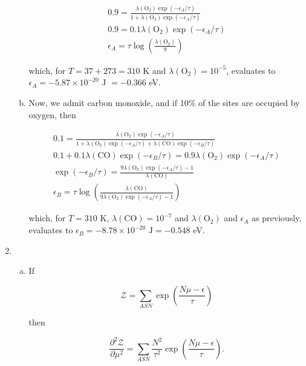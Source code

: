 \documentclass{article}
\begin{document}
\begin{enumerate}
\begin{enumerate}[(a)]
		\begin{gather*}
		0.9 = \frac{\lambda(\text{O}_2)\exp(-\epsilon_A / \tau)}{1 + \lambda(\text{O}_2)\exp(-\epsilon_A / \tau)} \\
		0.9 = 0.1 \lambda(\text{O}_2)\exp(-\epsilon_A / \tau) \\
		\epsilon_A = \tau \log \left( \frac{\lambda(\text{O}_2)}{9} \right)
		\end{gather*}

		which, for $T = 37 + 273 = 310$ K and $\lambda(\text{O}_2) = 10^{-5}$, evaluates to $\epsilon_A = -5.87 \times 10^{-20}$ J $= -0.366$ eV.

		\item

		Now, we admit carbon monoxide, and if 10\% of the sites are occupied by oxygen, then

		\begin{gather*}
		0.1 = \frac{\lambda(\text{O}_2)\exp(-\epsilon_A / \tau)}{1 + \lambda(\text{O}_2)\exp(-\epsilon_A / \tau) + \lambda(\text{CO})\exp(-\epsilon_B / \tau)} \\
		0.1 + 0.1\lambda(\text{CO})\exp(-\epsilon_B / \tau) = 0.9\lambda(\text{O}_2)\exp(-\epsilon_A / \tau) \\
		\exp(-\epsilon_B / \tau) = \frac{9\lambda(\text{O}_2)\exp(-\epsilon_A / \tau) - 1}{\lambda(\text{CO})} \\
		\epsilon_B = \tau \log \left(\frac{\lambda(\text{CO})}{9\lambda(\text{O}_2)\exp(-\epsilon_A / \tau) - 1} \right) 
		\end{gather*}

		which, for $T = 310$ K, $\lambda(\text{CO}) = 10^{-7}$ and $\lambda(\text{O}_2)$ and $\epsilon_A$ as previously, evaluates to $\epsilon_B = -8.78 \times 10^{-20} \text{ J} = -0.548$ eV.

	\end{enumerate}

	\item

	\begin{enumerate}[(a)]

		\item

		If 

		$$\mathcal{Z} = \sum _{ASN} \exp \left( \frac{N\mu - \epsilon}{\tau} \right)$$

		then

		$$\frac{\partial^2 \mathcal{Z}}{\partial \mu^2} = \sum_{ASN} \frac{N^2}{\tau^2} \exp \left( \frac{N\mu - \epsilon}{\tau} \right).$$


\end{enumerate}
\end{enumerate}
\end{document}
